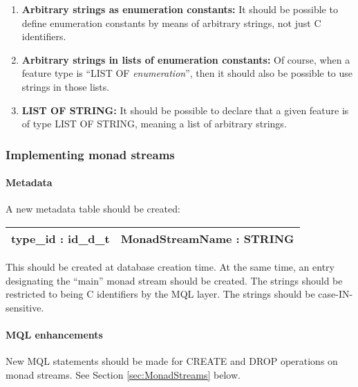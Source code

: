 \documentclass[a4paper,12pt]{article}
\begin{document}
\begin{enumerate}
  \begin{enumerate}
    
  \item \textbf{Arbitrary strings as enumeration constants:} It
    should be possible to define enumeration constants by means of
    arbitrary strings, not just C identifiers.
    
  \item \textbf{Arbitrary strings in lists of enumeration constants:}
    Of course, when a feature type is ``LIST OF
    \textit{enumeration}'', then it should also be possible to use
    strings in those lists.
      
  \item \textbf{LIST OF STRING:} It should be possible to declare that
    a given feature is of type LIST OF STRING, meaning a list of
    arbitrary strings.
      
  \end{enumerate}
  
\end{enumerate}

\subsubsection{Implementing monad streams}

\paragraph{Metadata}

A new metadata table should be created:

\bigskip

\noindent\begin{tabular}{|l|l|}
\hline
\textbf{type\_id : id\_d\_t} & \textbf{MonadStreamName : STRING}\\
\hline
\end{tabular}

\bigskip

\noindent This should be created at database creation time.  At the
same time, an entry designating the ``main'' monad stream should be
created.  The strings should be restricted to being C identifiers by
the MQL layer.  The strings should be case-IN-sensitive.

\paragraph{MQL enhancements}

New MQL statements should be made for CREATE and DROP operations on
monad streams.  See Section \ref{sec:MonadStreams} below.
\end{document}
